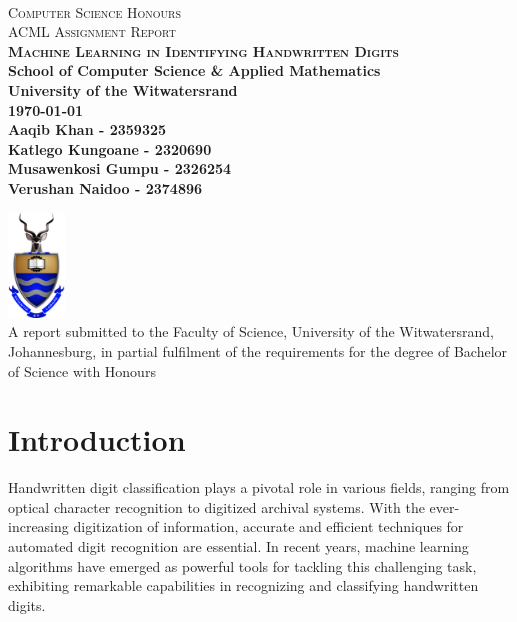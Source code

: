 \documentclass[a4paper,twoside,10pt]{article}
\begin{document}
\onecolumn
\singlespacing
\thispagestyle{empty}
\setcounter{page}{-1}
\
\begin{center}
  \vfill
  {
  \huge \textsc{Computer Science Honours}\\
  \huge \textsc{ACML Assignment Report}\\
  \vspace{20mm}
  \huge \bf \textsc{Machine Learning in Identifying Handwritten Digits}\\
  \vspace{5mm}
  \large School of Computer Science \& Applied Mathematics\\
  \large University of the Witwatersrand\\[20pt]
  \today \\
  \vspace{5mm}
  \normalsize
  Aaqib Khan - 2359325\\[10pt]
  Katlego Kungoane - 2320690\\[10pt]
  Musawenkosi Gumpu - 2326254\\[10pt]
  Verushan Naidoo - 2374896
  }

  \vfill
  \includegraphics[width=1.5cm]{wits}
  \vspace{10pt}\\
  \small{A report submitted to the Faculty of Science, University of the Witwatersrand, Johannesburg,
in partial fulfilment of the requirements for the degree of Bachelor of Science with Honours}\\
\end{center}
\vfill
\newpage

\pagestyle{plain}
\setcounter{page}{-1}
\newpage
{}

\section{Introduction}
Handwritten digit classification plays a pivotal role in various fields, ranging from optical character recognition to digitized archival systems. With the ever-increasing digitization of information, accurate and efficient techniques for automated digit recognition are essential. In recent years, machine learning algorithms have emerged as powerful tools for tackling this challenging task, exhibiting remarkable capabilities in recognizing and classifying handwritten digits.
\end{document}
